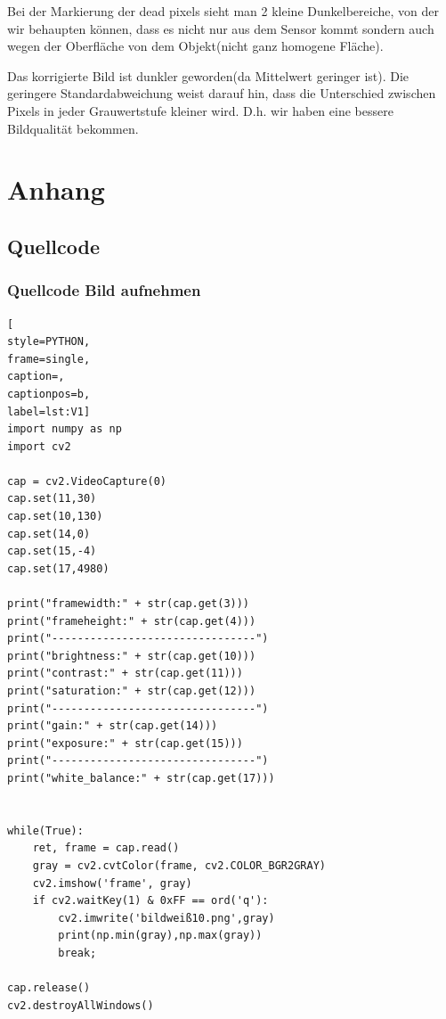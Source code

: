\documentclass[12pt, oneside, a4paper, \docLanguage]{report}
\begin{document}
Bei der Markierung der dead pixels sieht man 2 kleine Dunkelbereiche, von der wir behaupten können, dass es nicht nur aus dem Sensor kommt sondern auch wegen der Oberfläche von dem Objekt(nicht ganz homogene Fläche).

Das korrigierte Bild ist dunkler geworden(da Mittelwert geringer ist). Die geringere Standardabweichung weist darauf hin, dass die Unterschied zwischen Pixels in jeder Grauwertstufe kleiner wird. D.h. wir haben eine bessere Bildqualität bekommen.
%
%
\renewcommand\thesection{A.\arabic{section}}
\renewcommand\thesubsection{\thesection.\arabic{subsection}}

\chapter*{Anhang}
\label{chap:APPENDIX}
\addtocounter{chapter}{1}
\setcounter{section}{0}

\section{Quellcode}
\label{chap:APPENDIX_SOURCECODE}

\subsection{Quellcode Bild aufnehmen}
\label{chap:APPENDIX_SOURCECODE_V1}
\begin{lstlisting}[
style=PYTHON,
frame=single,
caption=,
captionpos=b,
label=lst:V1]
import numpy as np
import cv2

cap = cv2.VideoCapture(0)
cap.set(11,30)
cap.set(10,130)
cap.set(14,0)
cap.set(15,-4)
cap.set(17,4980)

print("framewidth:" + str(cap.get(3)))
print("frameheight:" + str(cap.get(4)))
print("--------------------------------")
print("brightness:" + str(cap.get(10)))
print("contrast:" + str(cap.get(11)))
print("saturation:" + str(cap.get(12)))
print("--------------------------------")
print("gain:" + str(cap.get(14)))
print("exposure:" + str(cap.get(15)))
print("--------------------------------")
print("white_balance:" + str(cap.get(17)))


while(True):
    ret, frame = cap.read()
    gray = cv2.cvtColor(frame, cv2.COLOR_BGR2GRAY)
    cv2.imshow('frame', gray)
    if cv2.waitKey(1) & 0xFF == ord('q'):
        cv2.imwrite('bildweiß10.png',gray)
        print(np.min(gray),np.max(gray))
        break;
        
cap.release()
cv2.destroyAllWindows()
\end{lstlisting}
\end{document}
